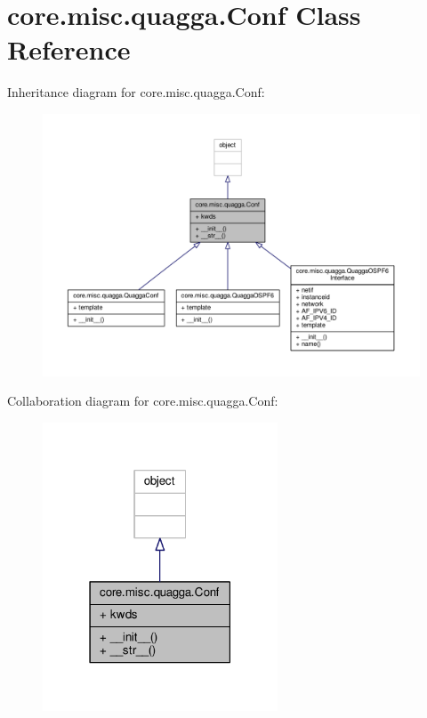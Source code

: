 \hypertarget{classcore_1_1misc_1_1quagga_1_1_conf}{\section{core.\+misc.\+quagga.\+Conf Class Reference}
\label{classcore_1_1misc_1_1quagga_1_1_conf}
}


Inheritance diagram for core.\+misc.\+quagga.\+Conf\+:
\nopagebreak
\begin{figure}[H]
\begin{center}
\leavevmode
\includegraphics[width=350pt]{classcore_1_1misc_1_1quagga_1_1_conf__inherit__graph}
\end{center}
\end{figure}


Collaboration diagram for core.\+misc.\+quagga.\+Conf\+:
\nopagebreak
\begin{figure}[H]
\begin{center}
\leavevmode
\includegraphics[width=198pt]{classcore_1_1misc_1_1quagga_1_1_conf__coll__graph}
\end{center}
\end{figure}
